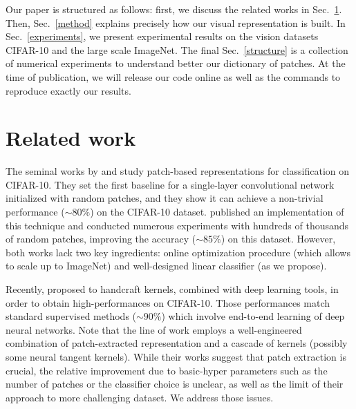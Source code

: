 \documentclass{article} %
\begin{document}
Our paper is structured as follows: first, we discuss the related works in Sec.~\ref{related_work}. Then, Sec.~\ref{method} explains precisely how our visual representation is built. In Sec.~\ref{experiments}, we present experimental results on the vision datasets CIFAR-10 and the large scale  ImageNet. The final Sec.~\ref{structure} is a collection of numerical experiments to understand better our dictionary of patches. At the time of publication, we will release our code online as well as the commands to reproduce exactly our results.


\section{Related work}
\label{related_work}

The seminal works by \cite{coates2011analysis} and \cite{coates2011importance}  study patch-based representations for classification on CIFAR-10.
They set the first baseline for a single-layer convolutional network initialized with random patches, and they show it can achieve a non-trivial performance ($\sim 80 \%$) on the CIFAR-10 dataset. 
 \cite{recht2019imagenet} published an implementation of this technique and conducted numerous experiments with hundreds of thousands of random patches, improving the accuracy ($\sim 85 \%$) on this dataset.
However, both works lack two key ingredients: online optimization procedure  (which allows to scale up to ImageNet) and well-designed linear classifier (as we propose).

Recently, \citep{li2019enhanced,shankar2020neural} proposed to handcraft kernels, combined with deep learning tools, in order to obtain high-performances on CIFAR-10.
Those performances  match standard supervised methods ($\sim 90\%$) which involve end-to-end learning of deep neural networks.
Note that the line of work \citep{li2019enhanced,shankar2020neural,mairal2016end} employs a well-engineered combination of patch-extracted representation and a cascade of kernels (possibly some neural tangent kernels).
While their works suggest that patch extraction is crucial, the relative improvement due to basic-hyper parameters such as the number of patches or the classifier choice is unclear, as well as the limit of their approach to more challenging dataset.
We address those issues.
\end{document}
